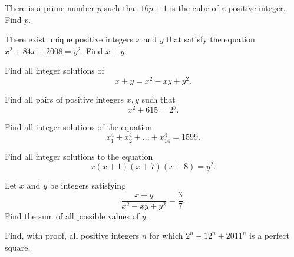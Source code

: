 \documentclass[mast]{lucky}
\begin{document}
\begin{prob}[AIME I 2015/3]{4}

There is a prime number $p$ such that $16p+1$ is the cube of a positive integer. Find $p$.

\end{prob}

\begin{prob}[AIME I 2008/4]{4}

There exist unique positive integers $x$ and $y$ that satisfy the equation $x^2 + 84x + 2008 = y^2$. Find $x + y$.

\end{prob}

\begin{prob}[Moscow MO 1944]{6}
 
Find all integer solutions of 
$$x+y=x^2-xy+y^2.$$

\end{prob}

\begin{prob}[Italy MO 1995]{6}
 
Find all pairs of positive integers $x,y$ such that
$$x^2+615=2^y.$$

\end{prob}

\begin{prob}[USAMO 1979]{9}
 
Find all integer solutions of the equation
$$x_1^4 + x_2^4 + \ldots + x_{14}^4 = 1599.$$

\end{prob}

\begin{prob}{9}
 
Find all integer solutions to the equation
$$x(x+1)(x+7)(x+8) = y^2.$$

\end{prob}

\begin{prob}[Russia MO 1986]{9}

Let $x$ and $y$ be integers satisfying
$$\frac{x+y}{x^2-xy+y^2} = \frac{3}{7}.$$
Find the sum of all possible values of $y$.  

\end{prob}

\begin{prob}[USAJMO 2011/1]{13}

Find, with proof, all positive integers $n$ for which $2^n + 12^n + 2011^n$ is a perfect square.

\end{prob}
\end{document}

